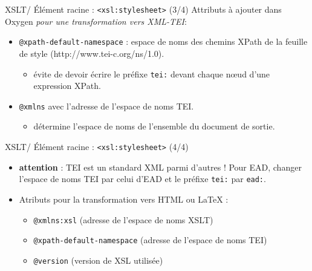 \documentclass{beamer}
\begin{document}
    \begin{frame}{XSLT/ Élément racine : \texttt{<xsl:stylesheet>} (3/4)}
    \Large Attributs à ajouter dans Oxygen \textit{pour une transformation vers XML-TEI}:
        \begin{itemize}
            \item \texttt{@xpath-default-namespace} :  espace de noms des chemins XPath de la feuille de style (http://www.tei-c.org/ns/1.0).
            \begin{itemize}
            \large
                \item évite de devoir écrire le préfixe \texttt{tei:} devant chaque n\oe ud d'une expression XPath.
            \end{itemize}
            \bigskip
            \item \texttt{@xmlns} avec l'adresse de l'espace de noms TEI.
            \begin{itemize}
            \large
                \item détermine l'espace de noms de l'ensemble du document de sortie.
            \end{itemize}
        \end{itemize}
    \end{frame}

    \begin{frame}{XSLT/ Élément racine : \texttt{<xsl:stylesheet>} (4/4)}
    \Large
        \begin{itemize}
            \item \textbf{attention} : TEI est un standard XML parmi d'autres ! Pour EAD, changer l'espace de noms TEI par celui d'EAD et le préfixe \texttt{tei:} par \texttt{ead:}.
            \bigskip
            \item Atributs pour la transformation vers HTML ou LaTeX : 
            \begin{itemize}
            \Large
                \item \texttt{@xmlns:xsl} (adresse de l'espace de noms XSLT)
                \item \texttt{@xpath-default-namespace} (adresse de l'espace de noms TEI)
                \item \texttt{@version} (version de XSL utilisée)
            \end{itemize}
        \end{itemize}
    \end{frame}
    
\end{document}
